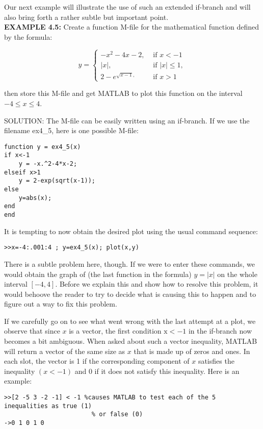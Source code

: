 \documentclass[../main.tex]{subfiles}
\begin{document}
Our next example will illustrate the use of such an extended if-branch and will also bring forth a rather subtle but important point.\\

\textbf{EXAMPLE 4.5:} Create a function M-file for the mathematical function defined by the formula:

$$
y= \begin{cases}-x^{2}-4 x-2, & \text { if } x<-1 \\ |x|, & \text { if }|x| \leq 1, \\ 2-e^{\sqrt{x-1},} & \text { if } x>1\end{cases}
$$

then store this M-file and get MATLAB to plot this function on the interval $-4 \leq x \leq 4$.

SOLUTION: The M-file can be easily written using an if-branch. If we use the filename ex4\_5, here is one possible M-file:

\begin{verbatim}
function y = ex4_5(x)
if x<-1
	y = -x.^2-4*x-2;
elseif x>1
	y = 2-exp(sqrt(x-1));
else
	y=abs(x);
end
end 
\end{verbatim}

It is tempting to now obtain the desired plot using the usual command sequence:

\begin{verbatim}>>x=-4:.001:4 ; y=ex4_5(x); plot(x,y) \end{verbatim}

There is a subtle problem here, though. If we were to enter these commands, we would obtain the graph of (the last function in the formula) $y=|x|$ on the whole interval $[-4,4]$. Before we explain this and show how to resolve this problem, it would behoove the reader to try to decide what is causing this to happen and to figure out a way to fix this problem.

If we carefully go on to see what went wrong with the last attempt at a plot, we observe that since $x$ is a vector, the first condition $\mathrm{x}<-1$ in the if-branch now becomes a bit ambiguous. When asked about such a vector inequality, MATLAB will return a vector of the same size as $x$ that is made up of zeros and ones. In each slot, the vector is 1 if the corresponding component of $x$ satisfies the inequality $(x<-1)$ and 0 if it does not satisfy this inequality. Here is an example:

\begin{verbatim}
>>[2 -5 3 -2 -1] < -1 %causes MATLAB to test each of the 5 inequalities as true (1)
						% or false (0)
->0 1 0 1 0
\end{verbatim}
\end{document}
